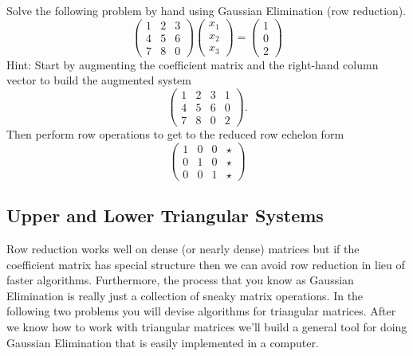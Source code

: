 \begin{problem}
    Solve the following problem by hand using Gaussian Elimination (row reduction).
    \[ \begin{pmatrix} 1 & 2 & 3 \\ 4 & 5 & 6 \\ 7 & 8 & 0 \end{pmatrix} \begin{pmatrix}
            x_1 \\ x_2 \\ x_3 \end{pmatrix} = \begin{pmatrix} 1 \\ 0 \\ 2\end{pmatrix} \]
    Hint: Start by augmenting the coefficient matrix and the right-hand column vector to
    build the augmented system
    \[ \left( \begin{array}{ccc|c} 1 & 2 & 3 & 1 \\ 4 & 5 & 6 & 0 \\ 7 & 8 & 0 & 2
    \end{array} \right). \]
    Then perform row operations to get to the reduced row echelon form
    \[ \left( \begin{array}{ccc|c} 1 & 0 & 0 & \star \\
        0 & 1 & 0 & \star \\
        0 & 0 & 1 & \star \end{array} \right) \]
\end{problem}


\subsection{Upper and Lower Triangular Systems}
Row reduction works well on dense (or nearly dense) matrices but if the coefficient matrix
has special structure then we can avoid row reduction in lieu of faster algorithms.
Furthermore, the process that you know as Gaussian Elimination is really just a collection
of sneaky matrix operations.  In the
following two problems you will devise algorithms for triangular matrices.  After we know
how to work with triangular matrices we'll build a general tool for doing Gaussian
Elimination that is easily implemented in a computer.

